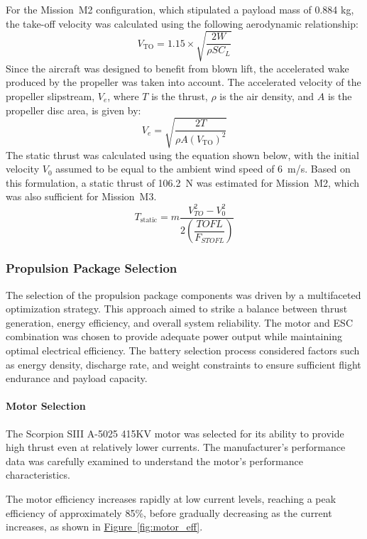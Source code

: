 \documentclass[10pt, letterpaper]{article}
\newcommand{\Filler}{}
\begin{document}
For the Mission~M2 configuration, which stipulated a payload mass of 0.884 kg, the take-off velocity was calculated using the following aerodynamic relationship:
\begin{equation}
\label{eq:take_off_velocity}
V_{\text{TO}} = 1.15 \times \sqrt{\frac{2W}{\rho S C_L}}
\end{equation}
Since the aircraft was designed to benefit from blown lift, the accelerated wake produced by the propeller was taken into account. The accelerated velocity of the propeller slipstream, $V_e$, where $T$ is the thrust, $\rho$ is the air density, and $A$ is the propeller disc area, is given by:
\begin{equation}
\label{eq:accelerated_velocity_of_the_propeller_slipstream}
V_e = \sqrt{\frac{2T}{\rho A \left(V_{\text{TO}}\right)^2}}
\end{equation}
The static thrust was calculated using the equation shown below, with the initial velocity $V_0$ assumed to be equal to the ambient wind speed of 6~m/s. Based on this formulation, a static thrust of 106.2~N was estimated for Mission~M2, which was also sufficient for Mission~M3.
\begin{equation}
\label{eq:static_thrust}
T_{\text{static}} 
= m \frac{V_{TO}^{2} - V_{0}^{2}}
{2 \left( \dfrac{TOFL}{F_{STOFL}} \right)}
\end{equation}
\Filler
\subsubsection{Propulsion Package Selection}
The selection of the propulsion package components was driven by a multifaceted optimization strategy. This approach aimed to strike a balance between thrust generation, energy efficiency, and overall system reliability. The motor and ESC combination was chosen to provide adequate power output while maintaining optimal electrical efficiency. The battery selection process considered factors such as energy density, discharge rate, and weight constraints to ensure sufficient flight endurance and payload capacity.
\paragraph{Motor Selection}
The Scorpion SIII A-5025 415KV motor was selected for its ability to provide high thrust even at relatively lower currents. The manufacturer’s performance data was carefully examined to understand the motor’s performance characteristics.

The motor efficiency increases rapidly at low current levels, reaching a peak efficiency of approximately 85\%, before gradually decreasing as the current increases, as shown in \hyperref[fig:motor_eff]{Figure~\ref*{fig:motor_eff}}.
\end{document}
